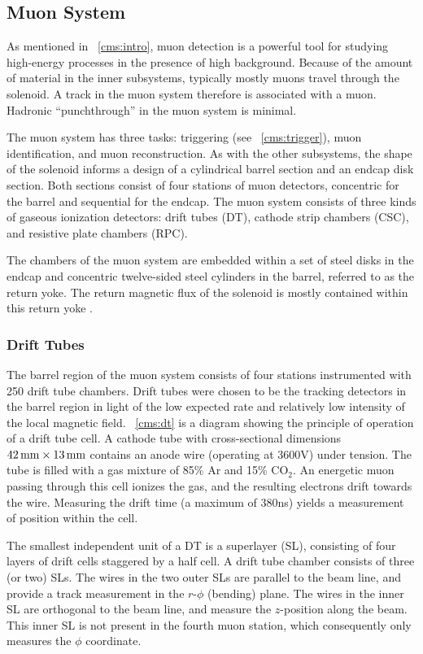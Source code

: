 \subsection{Muon System}
As mentioned in \Sec~\ref{cms:intro}, muon detection is a powerful tool for studying high-energy processes in the presence of high background.
Because of the amount of material in the inner subsystems, typically mostly muons travel through the solenoid.
A track in the muon system therefore is associated with a muon.
Hadronic ``punchthrough'' in the muon system is minimal.

The muon system has three tasks: triggering (see \Sec~\ref{cms:trigger}), muon identification, and muon reconstruction.
As with the other subsystems, the shape of the solenoid informs a design of a cylindrical barrel section and an endcap disk section.
Both sections consist of four stations of muon detectors, concentric for the barrel and sequential for the endcap.
The muon system consists of three kinds of gaseous ionization detectors: drift tubes (DT), cathode strip chambers (CSC), and resistive plate chambers (RPC).

The chambers of the muon system are embedded within a set of steel disks in the endcap and concentric twelve-sided steel cylinders in the barrel, referred to as the return yoke.
The return magnetic flux of the solenoid is mostly contained within this return yoke \cite{Chatrchyan:2008zzk, CMS:1997dma}.

\subsubsection{Drift Tubes}
The barrel region of the muon system consists of four stations instrumented with 250 drift tube chambers.
Drift tubes were chosen to be the tracking detectors in the barrel region in light of the low expected rate and relatively low intensity of the local magnetic field.
\Fig~\ref{cms:dt} is a diagram showing the principle of operation of a drift tube cell.
A cathode tube with cross-sectional dimensions $42 \,\text{mm} \times 13 \,\text{mm}$ contains an anode wire (operating at 3600\unit{V}) under tension.
The tube is filled with a gas mixture of 85\% Ar and 15\% CO$_2$.
An energetic muon passing through this cell ionizes the gas, and the resulting electrons drift towards the wire.
Measuring the drift time (a maximum of 380\unit{ns}) yields a measurement of position within the cell.

The smallest independent unit of a DT is a superlayer (SL), consisting of four layers of drift cells staggered by a half cell.
A drift tube chamber consists of three (or two) SLs.
The wires in the two outer SLs are parallel to the beam line, and provide a track measurement in the $r$-$\phi$ (bending) plane.
The wires in the inner SL are orthogonal to the beam line, and measure the $z$-position along the beam.
This inner SL is not present in the fourth muon station, which consequently only measures the $\phi$ coordinate.


